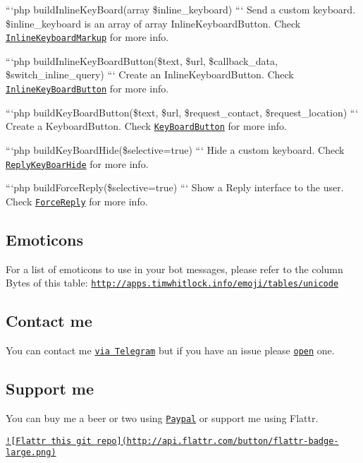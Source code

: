 ```php build\-Inline\-Key\-Board(array \$inline\-\_\-keyboard) ``` Send a custom keyboard. \$inline\-\_\-keyboard is an array of array Inline\-Keyboard\-Button. Check \href{https://core.telegram.org/bots/api#inlinekeyboardmarkup}{\tt Inline\-Keyboard\-Markup} for more info.

```php build\-Inline\-Key\-Board\-Button(\$text, \$url, \$callback\-\_\-data, \$switch\-\_\-inline\-\_\-query) ``` Create an Inline\-Keyboard\-Button. Check \href{https://core.telegram.org/bots/api#inlinekeyboardbutton}{\tt Inline\-Key\-Board\-Button} for more info.

```php build\-Key\-Board\-Button(\$text, \$url, \$request\-\_\-contact, \$request\-\_\-location) ``` Create a Keyboard\-Button. Check \href{https://core.telegram.org/bots/api#keyboardbutton}{\tt Key\-Board\-Button} for more info.

```php build\-Key\-Board\-Hide(\$selective=true) ``` Hide a custom keyboard. Check \href{https://core.telegram.org/bots/api#replykeyboardhide}{\tt Reply\-Key\-Boar\-Hide} for more info.

```php build\-Force\-Reply(\$selective=true) ``` Show a Reply interface to the user. Check \href{https://core.telegram.org/bots/api#forcereply}{\tt Force\-Reply} for more info.

\subsection*{Emoticons }

For a list of emoticons to use in your bot messages, please refer to the column Bytes of this table\-: \href{http://apps.timwhitlock.info/emoji/tables/unicode}{\tt http\-://apps.\-timwhitlock.\-info/emoji/tables/unicode}

\subsection*{Contact me }

You can contact me \href{https://telegram.me/ggrillo}{\tt via Telegram} but if you have an issue please \href{https://github.com/Eleirbag89/TelegramBotPHP/issues}{\tt open} one.

\subsection*{Support me }

You can buy me a beer or two using \href{https://paypal.me/eleirbag89}{\tt Paypal} or support me using Flattr.

\href{https://flattr.com/submit/auto?user_id=eleirbag89&url=https://github.com/Eleirbag89/TelegramBotPHP&title=TelegramBotPHP&language=&tags=github&category=software}{\tt !\mbox{[}Flattr this git repo\mbox{]}(http\-://api.\-flattr.\-com/button/flattr-\/badge-\/large.\-png)} 